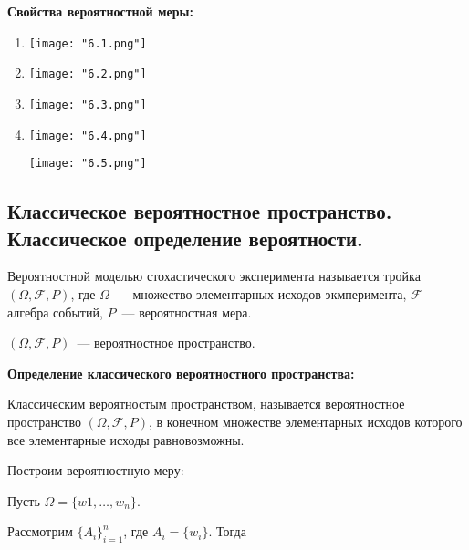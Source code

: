 \textbf{Свойства вероятностной меры:}    
    \smallskip

    \begin{enumerate}
        \item{
        \begin{center}
            \texttt{[image: "6.1.png"]}
        \end{center}
        }
        \item{
        \begin{center}
            \texttt{[image: "6.2.png"]}
        \end{center}
        }
        \item{
        \begin{center}
            \texttt{[image: "6.3.png"]}
        \end{center}
        }
        \item{
        \begin{center}
            \texttt{[image: "6.4.png"]}

            \texttt{[image: "6.5.png"]}
        \end{center}
        }
    \end{enumerate}

\subsection{Классическое вероятностное пространство. Классическое определение
вероятности.}

Вероятностной моделью стохастического эксперимента называется тройка
$(\Omega, \mathcal{F}, P)$, где $\Omega$~--- множество элементарных
исходов экмперимента, $\mathcal{F}$~--- алгебра событий, 
$P$~--- вероятностная мера.

$(\Omega, \mathcal{F}, P)$~--- вероятностное пространство.
\bigskip

\textbf{Определение классического вероятностного пространства:}
    \smallskip

    Классическим вероятностым пространством, называется вероятностное
    пространство $(\Omega, \mathcal{F}, P)$, в конечном множестве 
    элементарных исходов которого все элементарные исходы равновозможны.
    \bigskip

    Построим вероятностную меру:
    \bigskip

    Пусть $\Omega = \{w1, \dots, w_n\}$.

    Рассмотрим $\{ A_i \}^{n}_{i = 1}$, где $A_i = \{w_i\}$. Тогда

